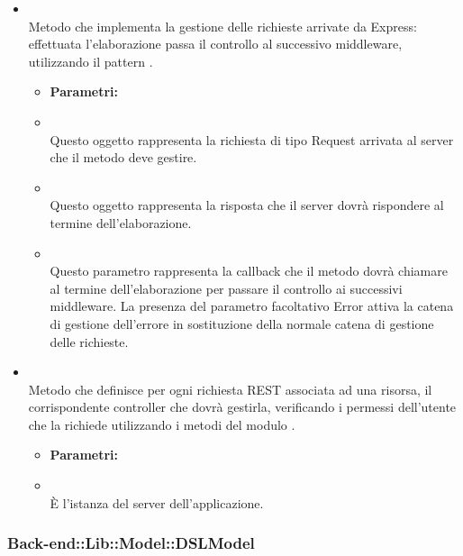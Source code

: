 \begin{itemize}
\item[] \textbf{} \\ Metodo che implementa la gestione delle richieste arrivate da Express: effettuata l'elaborazione passa il controllo al successivo middleware, utilizzando il pattern .
\begin{itemize}\addtolength{\itemsep}{-0.5\baselineskip}
\item[] \textbf{Parametri:}
\item[]  \\ Questo oggetto rappresenta la richiesta di tipo Request arrivata al server che il metodo deve gestire.
\item[]  \\ Questo oggetto rappresenta la risposta che il server dovrà rispondere al termine dell'elaborazione.
\item[]  \\ Questo parametro rappresenta la callback che il metodo dovrà chiamare al termine dell'elaborazione per passare il controllo ai successivi middleware.
La presenza del parametro facoltativo Error attiva la catena di gestione dell'errore in sostituzione della normale catena di gestione delle richieste.
\end{itemize}
\item[] \textbf{} \\ Metodo che definisce per ogni richiesta REST associata ad una risorsa, il corrispondente controller che dovrà gestirla, verificando i permessi dell'utente che la richiede utilizzando i metodi del modulo .

\begin{itemize}\addtolength{\itemsep}{-0.5\baselineskip}
\item[] \textbf{Parametri:}
\item[]  \\ È l'istanza del server dell'applicazione.
\end{itemize}
\end{itemize}

	\subsubsection{Back-end::Lib::Model::DSLModel} 
